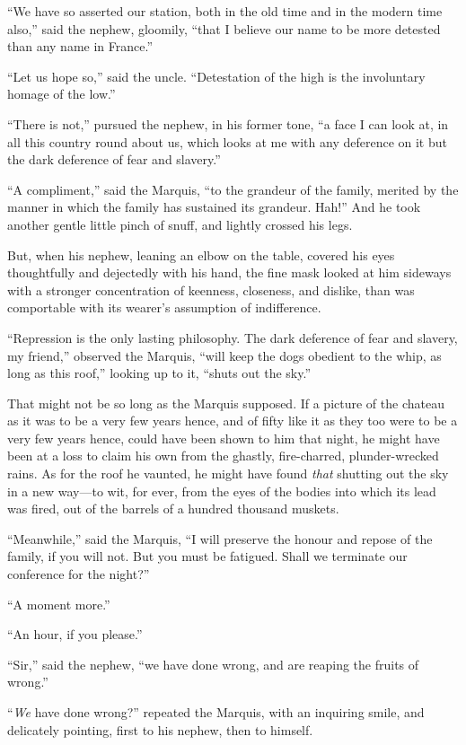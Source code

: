 ``We have so asserted our station, both in the old time and in the
modern time also,'' said the nephew, gloomily, ``that I believe our
name to be more detested than any name in France.''

``Let us hope so,'' said the uncle.  ``Detestation of the high is the
involuntary homage of the low.''

``There is not,'' pursued the nephew, in his former tone, ``a face I can
look at, in all this country round about us, which looks at me with
any deference on it but the dark deference of fear and slavery.''

``A compliment,'' said the Marquis, ``to the grandeur of the family,
merited by the manner in which the family has sustained its grandeur.
Hah!''  And he took another gentle little pinch of snuff, and lightly
crossed his legs.

But, when his nephew, leaning an elbow on the table, covered his eyes
thoughtfully and dejectedly with his hand, the fine mask looked at him
sideways with a stronger concentration of keenness, closeness, and dislike,
than was comportable with its wearer's assumption of indifference.

``Repression is the only lasting philosophy.  The dark deference of
fear and slavery, my friend,'' observed the Marquis, ``will keep the
dogs obedient to the whip, as long as this roof,'' looking up to it,
``shuts out the sky.''

That might not be so long as the Marquis supposed.  If a picture of
the chateau as it was to be a very few years hence, and of fifty like
it as they too were to be a very few years hence, could have been
shown to him that night, he might have been at a loss to claim his
own from the ghastly, fire-charred, plunder-wrecked rains.  As for
the roof he vaunted, he might have found \emph{that} shutting out the sky
in a new way---to wit, for ever, from the eyes of the bodies into which
its lead was fired, out of the barrels of a hundred thousand muskets.

``Meanwhile,'' said the Marquis, ``I will preserve the honour and repose
of the family, if you will not.  But you must be fatigued.  Shall we
terminate our conference for the night?''

``A moment more.''

``An hour, if you please.''

``Sir,'' said the nephew, ``we have done wrong, and are reaping the
fruits of wrong.''

``\emph{We} have done wrong?'' repeated the Marquis, with an inquiring
smile, and delicately pointing, first to his nephew, then to himself.

